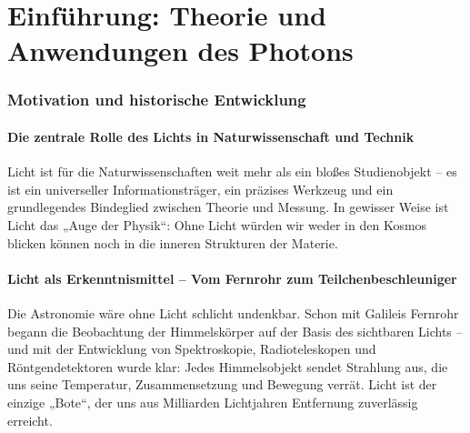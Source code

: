 \chapter{Einführung: Theorie und Anwendungen des Photons}

\setcounter{section}{1}
\setcounter{subsection}{0}
\setcounter{subsubsection}{1}
\setcounter{secnumdepth}{3}
\setlength{\parindent}{0pt}

\subsection{Motivation und historische Entwicklung}
\subsubsection{Die zentrale Rolle des Lichts in Naturwissenschaft und Technik}

Licht ist für die Naturwissenschaften weit mehr als ein bloßes Studienobjekt – es ist ein universeller Informationsträger, ein präzises Werkzeug und ein grundlegendes Bindeglied zwischen Theorie und Messung. In gewisser Weise ist Licht das „Auge der Physik“: Ohne Licht würden wir weder in den Kosmos blicken können noch in die inneren Strukturen der Materie.

\subsubsection*{Licht als Erkenntnismittel – Vom Fernrohr zum Teilchenbeschleuniger}
Die Astronomie wäre ohne Licht schlicht undenkbar. Schon mit Galileis Fernrohr begann die Beobachtung der Himmelskörper auf der Basis des sichtbaren Lichts – und mit der Entwicklung von Spektroskopie, Radioteleskopen und Röntgendetektoren wurde klar: Jedes Himmelsobjekt sendet Strahlung aus, die uns seine Temperatur, Zusammensetzung und Bewegung verrät. Licht ist der einzige „Bote“, der uns aus Milliarden Lichtjahren Entfernung zuverlässig erreicht.

